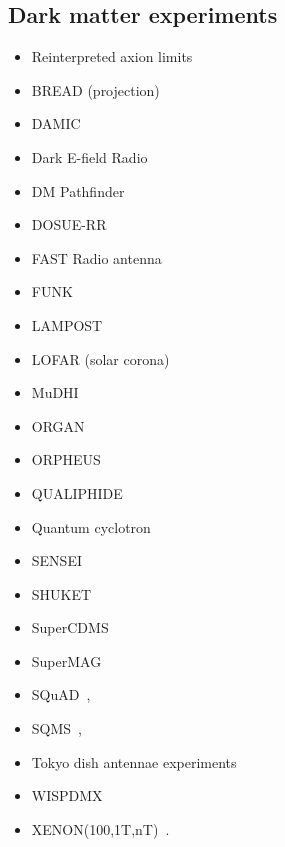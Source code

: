 \documentclass[9pt,twocolumn]{extarticle}
\begin{document}
\begin{mdframed}
\subsection*{Dark matter experiments}\vspace{-0.5em}
\begin{itemize}\setlength\itemsep{-0.5em}
\item Reinterpreted axion limits~\cite{Caputo:2021eaa}
\item BREAD (projection)~\cite{Liu:2021pei}
\item DAMIC~\cite{Aguilar-Arevalo:2019wdi}
\item Dark E-field Radio~\cite{Godfrey:2021tvs}
\item DM Pathfinder~\cite{Phipps:2019cqy}
\item DOSUE-RR~\cite{DOSUE-RR:2022ise}
 \item FAST Radio antenna~\cite{An:2022hhb}
\item FUNK~\cite{Andrianavalomahefa:2020ucg}
\item LAMPOST~\cite{Chiles:2021gxk}
\item LOFAR (solar corona)~\cite{An:2023wij}
\item MuDHI~\cite{Manenti:2021whp}
\item ORGAN~\cite{McAllister:2022ibe}
\item ORPHEUS~\cite{Cervantes:2022yzp}
\item QUALIPHIDE~\cite{Ramanathan:2022egk}
\item Quantum cyclotron~\cite{Fan:2022uwu}
\item SENSEI~\cite{Barak:2020fql}
\item SHUKET~\cite{Brun:2019kak}
\item SuperCDMS~\cite{Aralis:2019nfa}
\item SuperMAG~\cite{Fedderke:2021rrm,Fedderke:2021aqo}
\item SQuAD~\cite{Dixit:2020ymh},
\item SQMS~\cite{Cervantes:2022gtv},
\item Tokyo dish antennae experiments~\cite{Suzuki:2015sza,Knirck:2018ojz,Tomita:2020usq}
\item  WISPDMX~\cite{Nguyen:2019xuh}
\item  XENON(100,1T,nT)~\cite{Bloch:2016sjj,Aprile:2019xxb,Aprile:2020tmw, Bloch:2020uzh,XENON:2021myl,An:2020bxd}. 
\end{itemize}
\end{mdframed}


\onecolumn{


}
\end{document}
